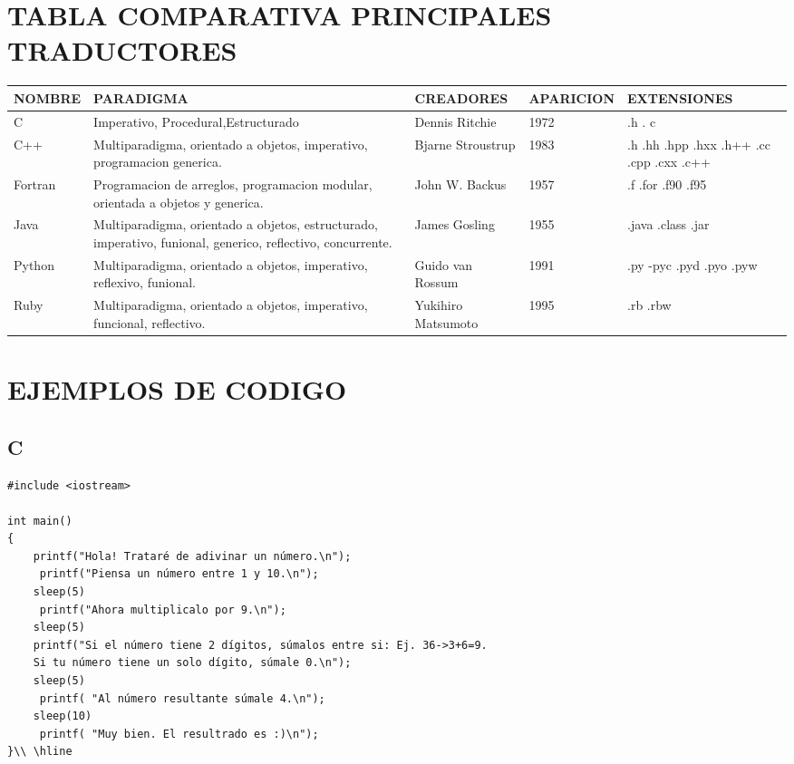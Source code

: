\documentclass[10pt]{article}
\begin{document}
\section{TABLA COMPARATIVA PRINCIPALES TRADUCTORES} 
 \begin{tabular}{|p{2.0cm}|p{4.0cm}|p{2.0cm}|p{2.0cm}|p{3.0cm}|}
 \hline
 NOMBRE & PARADIGMA & CREADORES & APARICION & EXTENSIONES \\ \hline
 C & Imperativo, Procedural,Estructurado & Dennis Ritchie & 1972 & .h . c \\ \hline 
C++ & Multiparadigma, orientado a objetos, imperativo, programacion generica. & Bjarne Stroustrup & 1983& .h .hh .hpp .hxx .h++ .cc .cpp .cxx .c++ \\ \hline
Fortran & Programacion de arreglos, programacion modular, orientada a objetos y generica. & John W. Backus & 1957 & .f .for .f90 .f95\\ \hline
Java & Multiparadigma, orientado a objetos, estructurado, imperativo, funional, generico, reflectivo, concurrente. & James Gosling & 1955 & .java .class .jar\\ \hline
Python & Multiparadigma, orientado a objetos, imperativo, reflexivo, funional. & Guido van Rossum & 1991 & .py -pyc .pyd .pyo .pyw\\ \hline
Ruby & Multiparadigma, orientado a objetos, imperativo, funcional, reflectivo. & Yukihiro Matsumoto & 1995 & .rb .rbw\\ \hline

 \hline
\end{tabular}
\section{EJEMPLOS DE CODIGO} 
\subsection*{C}
\begin{verbatim}#include <iostream>
 
int main()
{
    printf("Hola! Trataré de adivinar un número.\n");
     printf("Piensa un número entre 1 y 10.\n");
    sleep(5)	
     printf("Ahora multiplicalo por 9.\n");
    sleep(5)
    printf("Si el número tiene 2 dígitos, súmalos entre si: Ej. 36->3+6=9. 
    Si tu número tiene un solo dígito, súmale 0.\n");
    sleep(5)
     printf( "Al número resultante súmale 4.\n");
    sleep(10)	
     printf( "Muy bien. El resultrado es :)\n"); 
}\\ \hline
\end{verbatim}
\end{document}
